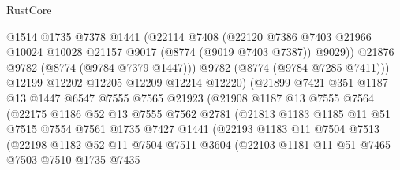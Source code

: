 \begin{lexlean}{RustCore}
\begin{coremodule}
                        @1514
                        @1735
                        @7378
                        @1441
                        (@22114
                          @7408
                          (@22120
                            @7386
                            @7403
                            @21966
                            @10024
                            @10028
                            @21157
                            @9017
                            (@8774 (@9019 @7403 @7387))
                            @9029))
                        @21876
                        @9782
                        (@8774 (@9784 @7379 @1447)))
                      @9782
                      (@8774 (@9784 @7285 @7411)))
                    @12199
                    @12202
                    @12205
                    @12209
                    @12214
                    @12220)
                  (@21899
                    @7421
                    @351
                    @1187
                    @13
                    @1447
                    @6547
                    @7555
                    @7565
                    @21923
                    (@21908
                      @1187
                      @13
                      @7555
                      @7564
                      (@22175
                        @1186
                        @52
                        @13
                        @7555
                        @7562
                        @2781
                        (@21813
                          @1183
                          @1185
                          @11
                          @51
                          @7515
                          @7554
                          @7561
                          @1735
                          @7427
                          @1441
                          (@22193
                            @1183
                            @11
                            @7504
                            @7513
                            (@22198
                              @1182
                              @52
                              @11
                              @7504
                              @7511
                              @3604
                              (@22103
                                @1181
                                @11
                                @51
                                @7465
                                @7503
                                @7510
                                @1735
                                @7435

\end{coremodule}
\end{lexlean}
